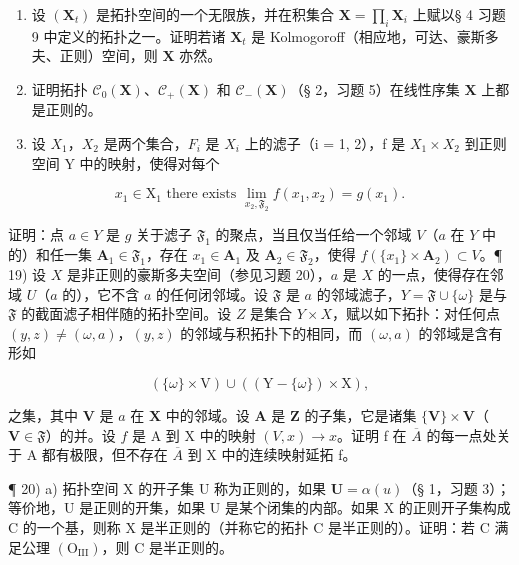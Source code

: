 \begin{enumerate}
\def\labelenumi{\arabic{enumi})}
\setcounter{enumi}{15}
\item
  设 \((\mathbf{X}_t)\) 是拓扑空间的一个无限族，并在积集合 \(\mathbf{X} = \prod_{i} \mathbf{X}_i\) 上赋以§ 4 习题 9 中定义的拓扑之一。证明若诸 \(\mathbf{X}_t\) 是 Kolmogoroff（相应地，可达、豪斯多夫、正则）空间，则 \(\mathbf{X}\) 亦然。
\item
  证明拓扑 \(\mathcal{C}_0(\mathbf{X})\)、\(\mathcal{C}_+(\mathbf{X})\) 和 \(\mathcal{C}_{-}(\mathbf{X})\)（§ 2，习题 5）在线性序集 \(\mathbf{X}\) 上都是正则的。
\item
  设 \(X_{1}\)，\(X_{2}\) 是两个集合，\(F_{i}\) 是 \(X_{i}\) 上的滤子（i = 1, 2），f 是 \(X_{1} \times X_{2}\) 到正则空间 Y 中的映射，使得对每个
\end{enumerate}

\[
x _ {1} \in \mathrm{X} _ {1} \text { there   exists } \lim _ {x _ {2}, \mathfrak {F} _ {2}} f (x _ {1}, x _ {2}) = g (x _ {1}).
\]

证明：点 \(a \in Y\) 是 \(g\) 关于滤子 \(\mathfrak{F}_1\) 的聚点，当且仅当任给一个邻域 \(V\)（\(a\) 在 \(Y\) 中的）和任一集 \(\mathbf{A}_1 \in \mathfrak{F}_1\)，存在 \(x_1 \in \mathbf{A}_1\) 及 \(\mathbf{A}_2 \in \mathfrak{F}_2\)，使得 \(f(\{x_1\} \times \mathbf{A}_2) \subset V\)。¶ 19) 设 \(X\) 是非正则的豪斯多夫空间（参见习题 20），\(a\) 是 \(X\) 的一点，使得存在邻域 \(U\)（\(a\) 的），它不含 \(a\) 的任何闭邻域。设 \(\mathfrak{F}\) 是 \(a\) 的邻域滤子，\(Y = \mathfrak{F} \cup \{\omega\}\) 是与 \(\mathfrak{F}\) 的截面滤子相伴随的拓扑空间。设 \(Z\) 是集合 \(Y \times X\)，赋以如下拓扑：对任何点 \((y, z) \neq (\omega, a)\)，\((y, z)\) 的邻域与积拓扑下的相同，而 \((\omega, a)\) 的邻域是含有形如

\[
(\{\omega \} \times \mathrm{V}) \cup ((\mathrm{Y} - \{\omega \}) \times \mathrm{X}),
\]

之集，其中 \(\mathbf{V}\) 是 \(a\) 在 \(\mathbf{X}\) 中的邻域。设 \(\mathbf{A}\) 是 \(\mathbf{Z}\) 的子集，它是诸集 \(\{\mathbf{V}\} \times \mathbf{V}\)（\(\mathbf{V} \in \mathfrak{F}\)）的并。设 \(f\) 是 A 到 X 中的映射 \((V, x) \rightarrow x\)。证明 f 在 \(\overline{A}\) 的每一点处关于 A 都有极限，但不存在 \(\overline{A}\) 到 X 中的连续映射延拓 f。

¶ 20) a) 拓扑空间 X 的开子集 U 称为正则的，如果 \(\mathbf{U} = \alpha(u)\)（§ 1，习题 3）；等价地，U 是正则的开集，如果 U 是某个闭集的内部。如果 X 的正则开子集构成 C 的一个基，则称 X 是半正则的（并称它的拓扑 C 是半正则的）。证明：若 C 满足公理 \((\mathrm{O}_{\mathrm{III}})\)，则 C 是半正则的。

